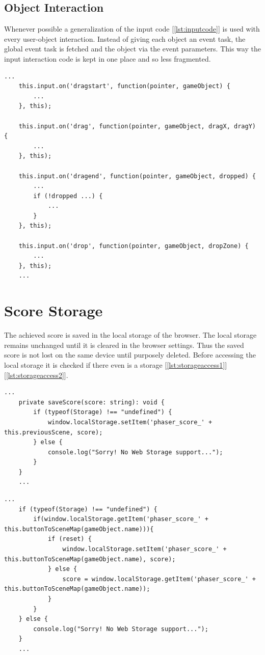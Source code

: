 \subsection{Object Interaction}\label{subsec:object-interaction}
Whenever possible a generalization of the input code [\ref{lst:inputcode}] is used with every user-object interaction.
Instead of giving each object an event task, the global event task is fetched and the object via the event parameters.
This way the input interaction code is kept in one place and so less fragmented.

\begin{lstlisting}[style=TypeScript, caption={Input code}, label={lst:inputcode}]
    ...
    this.input.on('dragstart', function(pointer, gameObject) {
        ...
    }, this);

    this.input.on('drag', function(pointer, gameObject, dragX, dragY) {
        ...
    }, this);

    this.input.on('dragend', function(pointer, gameObject, dropped) {
        ...
        if (!dropped ...) {
            ...
        }
    }, this);

    this.input.on('drop', function(pointer, gameObject, dropZone) {
        ...
    }, this);
    ...
\end{lstlisting}

\section{Score Storage}\label{sec:scorestorage}
The achieved score is saved in the local storage\cite{webstorage} of the browser.
The local storage remains unchanged until it is cleared in the browser settings.
Thus the saved score is not lost on the same device until purposely deleted.
Before accessing the local storage it is checked if there even is a storage [\ref{lst:storageaccess1}][\ref{lst:storageaccess2}].

\begin{lstlisting}[style=TypeScript, caption={Storage access (scoreScene.ts)}, label={lst:storageaccess1}]
    ...
    private saveScore(score: string): void {
        if (typeof(Storage) !== "undefined") {
            window.localStorage.setItem('phaser_score_' + this.previousScene, score);
        } else {
            console.log("Sorry! No Web Storage support...");
        }
    }
    ...
\end{lstlisting}

\begin{lstlisting}[style=TypeScript, caption={Storage access (levelMenuScene.ts)}, label={lst:storageaccess2}]
    ...
    if (typeof(Storage) !== "undefined") {
        if(window.localStorage.getItem('phaser_score_' + this.buttonToSceneMap(gameObject.name))){
            if (reset) {
                window.localStorage.setItem('phaser_score_' + this.buttonToSceneMap(gameObject.name), score);
            } else {
                score = window.localStorage.getItem('phaser_score_' + this.buttonToSceneMap(gameObject.name));
            }
        }
    } else {
        console.log("Sorry! No Web Storage support...");
    }
    ...
\end{lstlisting}

